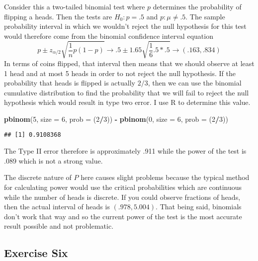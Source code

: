 \documentclass[]{article}
\newenvironment{Shaded}{\begin{snugshade}}{\end{snugshade}}
\newcommand{\KeywordTok}[1]{\textcolor[rgb]{0.13,0.29,0.53}{\textbf{#1}}}
\newcommand{\DataTypeTok}[1]{\textcolor[rgb]{0.13,0.29,0.53}{#1}}
\newcommand{\DecValTok}[1]{\textcolor[rgb]{0.00,0.00,0.81}{#1}}
\newcommand{\StringTok}[1]{\textcolor[rgb]{0.31,0.60,0.02}{#1}}
\newcommand{\OperatorTok}[1]{\textcolor[rgb]{0.81,0.36,0.00}{\textbf{#1}}}
\newcommand{\NormalTok}[1]{#1}
\begin{document}
Consider this a two-tailed binomial test where \(p\) determines the
probability of flipping a heads. Then the tests are \(H_0: p = .5\) and
\(p: \mu \neq .5\). The sample probability interval in which we wouldn't
reject the null hypothesis for this test would therefore come from the
binomial confidence interval equation \[
        p \pm z_{\alpha/2}\sqrt{\frac{1}{n}p(1-p)} \rightarrow
        .5 \pm 1.65\sqrt{\frac{1}{6}{.5*.5}} \rightarrow
        (.163,.834)
    \] In terms of coins flipped, that interval then means that we
should observe at least 1 head and at most 5 heads in order to not
reject the null hypothesis. If the probability that heads is flipped is
actually \(2/3\), then we can use the binomial cumulative distribution
to find the probability that we will fail to reject the null hypothesis
which would result in type two error. I use R to determine this value.

\begin{Shaded}
\begin{Highlighting}[]
\KeywordTok{pbinom}\NormalTok{(}\DecValTok{5}\NormalTok{, }\DataTypeTok{size =} \DecValTok{6}\NormalTok{, }\DataTypeTok{prob =}\NormalTok{ (}\DecValTok{2}\OperatorTok{/}\DecValTok{3}\NormalTok{)) }\OperatorTok{-}\StringTok{ }\KeywordTok{pbinom}\NormalTok{(}\DecValTok{0}\NormalTok{, }\DataTypeTok{size =} \DecValTok{6}\NormalTok{, }\DataTypeTok{prob =}\NormalTok{ (}\DecValTok{2}\OperatorTok{/}\DecValTok{3}\NormalTok{))}
\end{Highlighting}
\end{Shaded}

\begin{verbatim}
## [1] 0.9108368
\end{verbatim}

The Type II error therefore is approximately .911 while the power of the
test is .089 which is not a strong value.

The discrete nature of \(P\) here causes slight problems because the
typical method for calculating power would use the critical
probabilities which are continuous while the number of heads is
discrete. If you could observe fractions of heads, then the actual
interval of heads is \((.978, 5.004)\). That being said, binomials don't
work that way and so the current power of the test is the most accurate
result possible and not problematic.

\pagebreak

\subsection{Exercise Six}\label{exercise-six}
\end{document}

